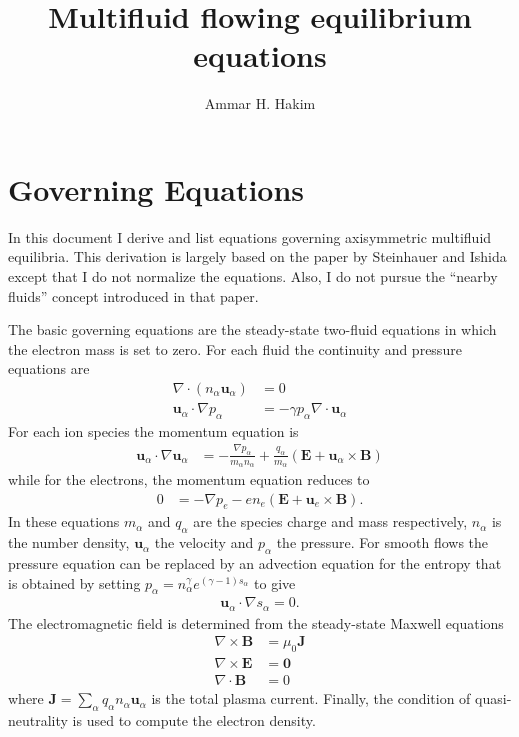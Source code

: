 \documentclass[11pt, reqno]{amsart}
\title[Multifluid Equilibrium]{Multifluid flowing equilibrium
  equations}%
\author{Ammar H. Hakim}%
\date{}
\newcommand{\mvec}[1]{\mathbf{#1}}
\theoremstyle{definition}
\begin{document}
\maketitle

\section{Governing Equations}

In this document I derive and list equations governing axisymmetric
multifluid equilibria. This derivation is largely based on the paper
by Steinhauer and Ishida\cite{Steinhauer:2006p526} except that I do
not normalize the equations. Also, I do not pursue the ``nearby
fluids'' concept introduced in that paper. 

The basic governing equations are the steady-state two-fluid equations
in which the electron mass is set to zero. For each fluid the
continuity and pressure equations are
\begin{align}
  \nabla\cdot(n_\alpha\mvec{u}_\alpha) &= 0 \label{eq:divNU} \\
  \mvec{u}_\alpha\cdot\nabla p_\alpha &= -\gamma p_\alpha \nabla\cdot\mvec{u}_\alpha
\end{align}
For each ion species the momentum equation is
\begin{align}
  \mvec{u}_\alpha\cdot\nabla \mvec{u}_\alpha &= -\frac{\nabla
    p_\alpha}{m_\alpha n_\alpha} 
  + \frac{q_\alpha}{m_\alpha}(\mvec{E} + \mvec{u}_\alpha\times
  \mvec{B})
\end{align}
while for the electrons, the momentum equation reduces to
\begin{align}
  0 &= -\nabla p_e - en_e(\mvec{E} + \mvec{u}_e\times\mvec{B}).
\end{align}
In these equations $m_\alpha$ and $q_\alpha$ are the species charge
and mass respectively, $n_\alpha$ is the number density,
$\mvec{u}_\alpha$ the velocity and $p_\alpha$ the pressure. For smooth
flows the pressure equation can be replaced by an advection equation
for the entropy that is obtained by setting $p_\alpha =
n_\alpha^\gamma e^{(\gamma-1)s_\alpha}$ to give
\begin{align}
  \mvec{u}_\alpha\cdot\nabla s_\alpha = 0. \label{eq:entropy}
\end{align}
The electromagnetic field is determined from the steady-state Maxwell
equations
\begin{align}
  \nabla\times \mvec{B} &= \mu_0 \mvec{J} \label{eq:curlB} \\
  \nabla\times \mvec{E} &= \mvec{0} \\
  \nabla\cdot\mvec{B} &= 0 \label{eq:divB}
\end{align}
where $\mvec{J}=\sum_\alpha q_\alpha n_\alpha\mvec{u}_\alpha$ is the
total plasma current. Finally, the condition of quasi-neutrality is
used to compute the electron density.
\end{document}
